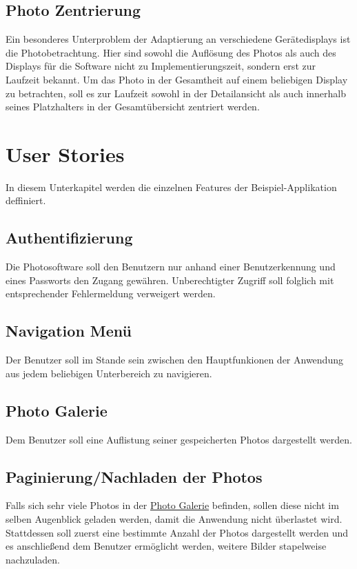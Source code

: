 \subsection{Photo Zentrierung}

Ein besonderes Unterproblem der Adaptierung an verschiedene Gerätedisplays ist die Photobetrachtung. Hier sind sowohl die Auflösung des Photos als auch des Displays für die Software nicht zu Implementierungszeit, sondern erst zur Laufzeit bekannt. Um das Photo in der Gesamtheit auf einem beliebigen Display zu betrachten, soll es zur Laufzeit sowohl in der Detailansicht als auch innerhalb seines Platzhalters in der Gesamtübersicht zentriert werden.

\section{User Stories}

In diesem Unterkapitel werden die einzelnen Features der Beispiel-Applikation deffiniert.

\subsection{Authentifizierung}

Die Photosoftware soll den Benutzern nur anhand einer Benutzerkennung und eines Passworts den Zugang gewähren. Unberechtigter Zugriff soll folglich mit entsprechender Fehlermeldung verweigert werden.

\subsection{Navigation Menü}

Der Benutzer soll im Stande sein zwischen den Hauptfunkionen der Anwendung aus jedem beliebigen Unterbereich zu navigieren.

\subsection{Photo Galerie}
\label{ssec:photo_galerie}

Dem Benutzer soll eine Auflistung seiner gespeicherten Photos dargestellt werden.

\subsection{Paginierung/Nachladen der Photos}

Falls sich sehr viele Photos in der \hyperref[ssec:photo_galerie]{Photo Galerie} befinden, sollen diese nicht im selben Augenblick geladen werden, damit die Anwendung nicht überlastet wird. Stattdessen soll zuerst eine bestimmte Anzahl der Photos dargestellt werden und es anschließend dem Benutzer ermöglicht werden, weitere Bilder stapelweise nachzuladen.

